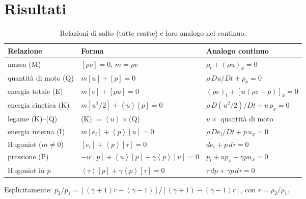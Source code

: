 \documentclass[11pt,a4paper]{article}
\newcommand{\jp}[1]{\left[#1\right]}            %
\newcommand{\av}[1]{\left\langle #1\right\rangle} %
\begin{document}
\section{Risultati}
\begin{table}[H]
  \centering
  \small
  \begin{tabular}{lll}
    \toprule
    Relazione & Forma & Analogo continuo \\
    \midrule
    massa (M) & $\jp{\rho v}=0$, $m=\rho v$ & $\rho_t+(\rho u)_x=0$ \\
    quantità di moto (Q) & $m\jp{u}+\jp{p}=0$ & $\rho\,Du/Dt+p_x=0$ \\
    energia totale (E) & $m\jp{e}+\jp{pu}=0$ & $(\rho e)_t+[u(\rho e+p)]_x=0$ \\
    \midrule
    energia cinetica (K) & $m\jp{u^2/2}+\av{u}\jp{p}=0$ & $\rho\,D(u^2/2)/Dt+u\,p_x=0$ \\
    legame (K)--(Q) & (K) $=\av{u}\times$(Q) & $u\times$ quantità di moto \\
    energia interna (I) & $m\jp{e_i}+\av{p}\jp{u}=0$ & $\rho\,De_i/Dt+p\,u_x=0$ \\
    Hugoniot ($m\neq0$) & $\jp{e_i}+\av{p}\jp{\tau}=0$ & $de_i+p\,d\tau=0$ \\
    pressione (P) & $-w\jp{p}+\av{u}\jp{p}+\gamma\av{p}\jp{u}=0$ & $p_t+up_x+\gamma pu_x=0$ \\
    Hugoniot in $p$ & $\av{\tau}\jp{p}+\gamma\av{p}\jp{\tau}=0$ & $\tau\,dp+\gamma p\,d\tau=0$ \\
    \bottomrule
  \end{tabular}
  \caption{Relazioni di salto (tutte esatte) e loro analogo nel continuo.}
\end{table}
Esplicitamente: $p_2/p_1=[(\gamma+1)r-(\gamma-1)]/[(\gamma+1)-(\gamma-1)r]$, con $r=\rho_2/\rho_1$.

\end{document}
